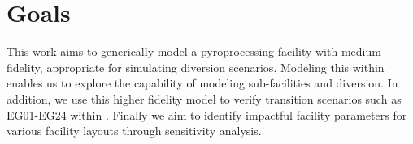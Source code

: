\section{Goals}

This work aims to generically model a pyroprocessing facility with medium fidelity, appropriate for simulating diversion scenarios. Modeling
this within \Cyclus enables us to explore the capability of modeling sub-facilities and diversion. In addition, we use this higher fidelity model to verify transition
scenarios such as EG01-EG24 within \Cyclus \cite{wigeland_nuclear_2014}. Finally we aim to identify impactful facility parameters for
various facility layouts through sensitivity analysis. 